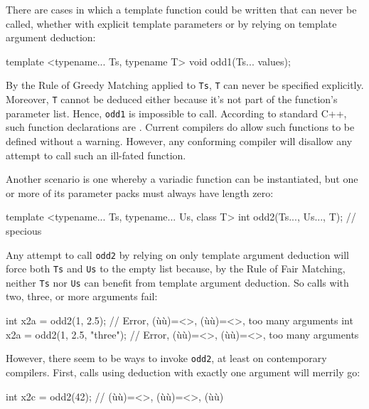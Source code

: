 There are cases in which a template function could be written that can
never be called, whether with explicit template parameters or by relying
on template argument deduction:

\begin{emcppslisting}
template <typename... Ts, typename T>
void odd1(Ts... values);
\end{emcppslisting}
    

\noindent By the Rule of Greedy Matching applied to \lstinline!Ts!, \lstinline!T! can
never be specified explicitly. Moreover, \lstinline!T! cannot be deduced
either because it's not part of the function's parameter list. Hence,
\lstinline!odd1! is impossible to call. According to standard C++, such
function declarations are . Current compilers do allow such functions to be defined
without a warning. However, any conforming compiler will disallow any
attempt to call such an ill-fated function.

Another scenario is one whereby a variadic function can be instantiated,
but one or more of its parameter packs must always have length zero:

\begin{emcppslisting}
template <typename... Ts, typename... Us, class T>
int odd2(Ts..., Us..., T);  // specious
\end{emcppslisting}
    

\noindent Any attempt to call \lstinline!odd2! by relying on only template argument
deduction will force both \lstinline!Ts! and \lstinline!Us! to the empty list
because, by the Rule of Fair Matching, neither \lstinline!Ts! nor
\lstinline!Us! can benefit from template argument deduction. So calls with
two, three, or more arguments fail:

\begin{emcppslisting}
int x2a = odd2(1, 2.5);           // Error, (ù{}ù)=<>, (ù{}ù)=<>, too many arguments
int x2a = odd2(1, 2.5, "three");  // Error, (ù{}ù)=<>, (ù{}ù)=<>, too many arguments
\end{emcppslisting}
    

\noindent However, there seem to be ways to invoke \lstinline!odd2!, at least on
contemporary compilers. First, calls using deduction with exactly one
argument will merrily go:

\begin{emcppslisting}
int x2c = odd2(42);  // (ù{}ù)=<>, (ù{}ù)=<>, (ù{}ù)
\end{emcppslisting}
    

